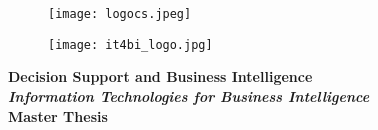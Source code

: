 \begin{titlepage}
\begin{figure}
\vspace{-2cm}
   \begin{minipage}[r]{0.46\linewidth}
   \hspace*{-1cm}
      \texttt{[image: logocs.jpeg]}
   \end{minipage} 
   \begin{minipage}[l]{0.46\linewidth}
   \hspace*{3.7cm}
      \texttt{[image: it4bi\_logo.jpg]}
   \end{minipage}
\end{figure}

\vspace*{0cm}
\begin{center}
\noindent \Huge \textbf{Decision Support and Business Intelligence} \\
\vspace*{0.4cm}
\noindent \Large \textit{\textbf{ Information Technologies for Business Intelligence}}\\
\vspace*{0.4cm}
\noindent \Huge \textbf{Master Thesis} \\


\end{center}
\end{titlepage}
